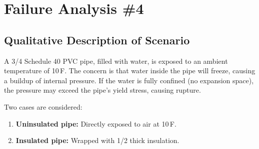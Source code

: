 \documentclass[12pt]{article}
\begin{document}
\section*{Failure Analysis \#4}
\subsection*{Qualitative Description of Scenario}
A 3/4 Schedule 40 PVC pipe, filled with water, is exposed to an ambient temperature of 10\,\textdegree F. The concern is that water inside the pipe will freeze, causing a buildup of internal pressure. If the water is fully confined (no expansion space), the pressure may exceed the pipe's yield stress, causing rupture.

Two cases are considered:
\begin{enumerate}
    \item \textbf{Uninsulated pipe:} Directly exposed to air at 10\,\textdegree F.
    \item \textbf{Insulated pipe:} Wrapped with 1/2\textquotedbl{} thick insulation.
\end{enumerate}
\end{document}
